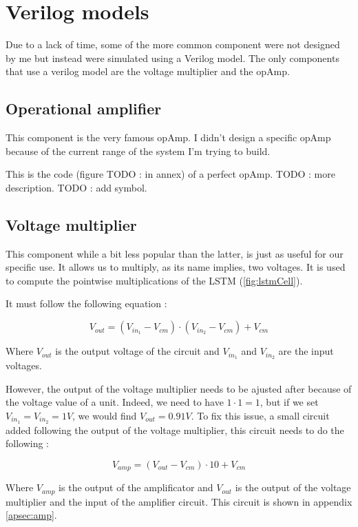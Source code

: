 \section{Verilog models}
\label{sec:models}

Due to a lack of time, some of the more common component were not designed by me but instead were simulated using a Verilog model. The only components that use a verilog model are the voltage multiplier and the \ac{opAmp}.

\subsection{Operational amplifier}

This component is the very famous \ac{opAmp}. I didn't design a specific \ac{opAmp} because of the current range of the system I'm trying to build.

This is the code (figure TODO : in annex) of a perfect \ac{opAmp}. TODO : more description.
TODO : add symbol.

\subsection{Voltage multiplier}

This component while a bit less popular than the latter, is just as useful for our specific use. It allows us to multiply, as its name implies, two voltages. It is used to compute the pointwise multiplications of the \ac{LSTM} (\cref{fig:lstmCell}).

It must follow the following equation :

\begin{equation}
  V_{out}=(V_{in_1}-V_{cm})\cdot (V_{in_2}-V_{cm}) + V_{cm}
\end{equation}

Where $V_{out}$ is the output voltage of the circuit and $V_{in_1}$ and $V_{in_2}$ are the input voltages.

However, the output of the voltage multiplier needs to be ajusted after because of the voltage value of a unit. Indeed, we need to have $1\cdot 1=1$, but if we set $V_{in_1}=V_{in_2}=1V$, we would find $V_{out}=0.91V$. To fix this issue, a small circuit added following the output of the voltage multiplier, this circuit needs to do the following :

\begin{equation}
  V_{amp}=(V_{out}-V_{cm})\cdot10+V_{cm}
\end{equation}

Where $V_{amp}$ is the output of the amplificator and $V_{out}$ is the output of the voltage multiplier and the input of the amplifier circuit.
This circuit is shown in appendix \ref{apsec:amp}.
